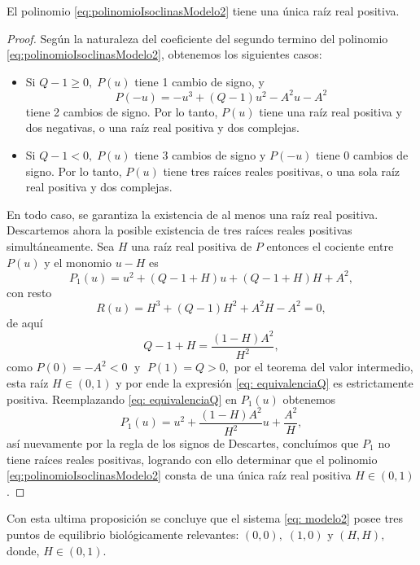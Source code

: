 \begin{pro}
	El polinomio \eqref{eq:polinomioIsoclinasModelo2} tiene una única raíz real positiva.
	\label{pro:exitenciaH}
\end{pro}
\begin{proof}
	Según la naturaleza del coeficiente del segundo termino del polinomio \eqref{eq:polinomioIsoclinasModelo2}, obtenemos los siguientes casos: 
	\begin{itemize}
		\item Si $Q-1 \geq 0, \; P(u)$ tiene 1 cambio de signo, y $$P(-u)=-u^{3}+(Q-1)u^{2}-A^{2}u-A^{2}$$ tiene 2 cambios de signo. Por lo tanto, $P(u)$ tiene una raíz real positiva y dos negativas, o una raíz real positiva y dos complejas.
		\item Si $Q-1<0, \; P(u)$ tiene 3 cambios de signo y $P(-u)$ tiene 0 cambios de signo. Por lo tanto, $P(u)$ tiene tres raíces reales positivas, o una sola raíz real positiva y dos complejas.
	\end{itemize}
	En todo caso, se garantiza la existencia de al menos una raíz real positiva. Descartemos ahora la posible existencia de tres raíces reales positivas simultáneamente. Sea $H$ una raíz real positiva de $P$ entonces el cociente entre $P(u)$ y el monomio $u - H$ es $$P_{1}(u) = u^{2}+(Q-1+H)u+(Q-1+H)H+A^{2},$$ con resto $$R(u) = H^{3}+(Q-1)H^{2}+A^{2}H-A^{2} = 0,$$ de aquí \begin{equation}
		Q-1+H = \dfrac{(1-H)A^{2}}{H^{2}},
		\label{eq: equivalenciaQ}
	\end{equation}
	como $P(0) = -A^{2}<0 \; \text{ y } \; P(1) = Q>0,$ por el teorema del valor intermedio, esta raíz $H \in (0,1)$ y por ende la expresión \eqref{eq: equivalenciaQ} es estrictamente positiva. Reemplazando \eqref{eq: equivalenciaQ} en $P_{1}(u)$ obtenemos $$P_{1}(u) = u^{2}+\dfrac{(1-H)A^{2}}{H^{2}}u+\dfrac{A^{2}}{H},$$ así nuevamente por la regla de los signos de Descartes, concluímos que $P_{1}$ no tiene raíces reales positivas, logrando con ello determinar que el polinomio \eqref{eq:polinomioIsoclinasModelo2} consta de una única raíz real positiva $H \in (0,1)$.
\end{proof}

\begin{remark}
	Con esta ultima proposición se concluye que el sistema \eqref{eq: modelo2} posee tres puntos de equilibrio biológicamente relevantes: $(0,0), \; (1,0) \text{ y } (H,H),$ donde, $H \in (0,1)$.
\end{remark}


